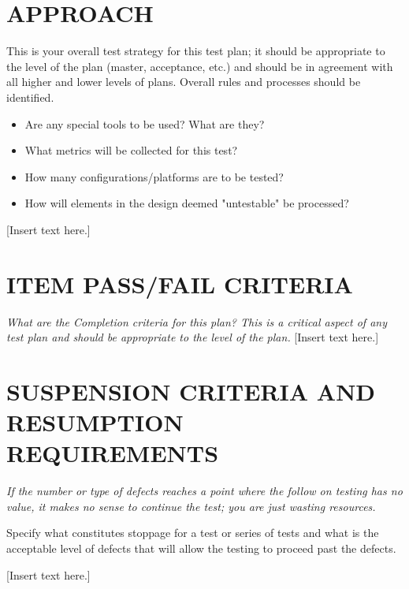 \section[APPROACH]{\bfseries\color{black} APPROACH}
{\itshape\color{black}

This is your overall test strategy for this test plan; it should be
appropriate to the level of the plan (master, acceptance, etc.) and
should be in agreement with all higher and lower levels of
plans. Overall rules and processes should be identified. 

\begin{itemize}
\item Are any special tools to be used? What are they?
\item What metrics will be collected for this test?
\item How many configurations/platforms are to be tested?
\item How will elements in the design deemed "untestable" be processed?
\end{itemize}
}
{\color{black}
[Insert text here.]}

\section[ITEM PASS/FAIL CRITERIA]{\bfseries\color{black}
	 ITEM PASS/FAIL CRITERIA}
{\itshape\color{black}
What are the Completion criteria for this plan? This is a critical
aspect of any test plan and should be appropriate to the level of the plan.
}
{\color{black}
[Insert text here.]}

\section[SUSPENSION CRITERIA]{\bfseries\color{black}
	 SUSPENSION CRITERIA AND RESUMPTION REQUIREMENTS}
{\itshape\color{black}
If the number or type of defects reaches a point where the follow on
testing has no value, it makes no sense to continue the test; you are
just wasting resources.

Specify what constitutes stoppage for a test or series of tests and
what is the acceptable level of defects that will allow the testing to
proceed past the defects. 
}
{\color{black}
[Insert text here.]}

